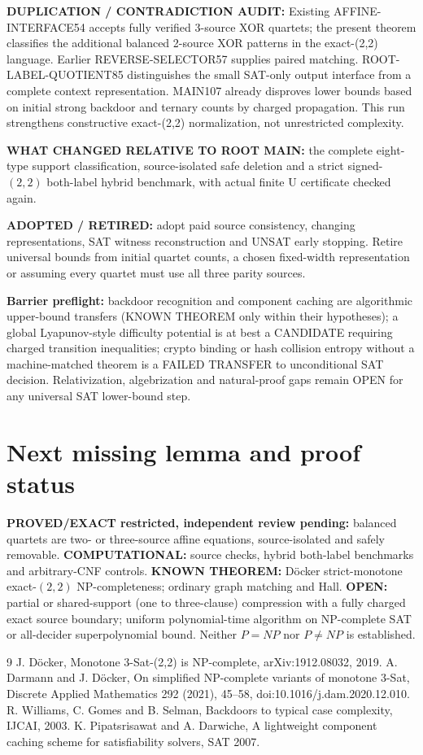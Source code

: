 \documentclass[11pt]{article}
\begin{document}
\textbf{DUPLICATION / CONTRADICTION AUDIT:} Existing AFFINE-INTERFACE54 accepts fully verified 3-source XOR quartets; the present theorem classifies the additional balanced 2-source XOR patterns in the exact-(2,2) language. Earlier REVERSE-SELECTOR57 supplies paired matching. ROOT-LABEL-QUOTIENT85 distinguishes the small SAT-only output interface from a complete context representation. MAIN107 already disproves lower bounds based on initial strong backdoor and ternary counts by charged propagation. This run strengthens constructive exact-(2,2) normalization, not unrestricted complexity.

\textbf{WHAT CHANGED RELATIVE TO ROOT MAIN:} the complete eight-type support classification, source-isolated safe deletion and a strict signed-$(2,2)$ both-label hybrid benchmark, with actual finite U certificate checked again.

\textbf{ADOPTED / RETIRED:} adopt paid source consistency, changing representations, SAT witness reconstruction and UNSAT early stopping. Retire universal bounds from initial quartet counts, a chosen fixed-width representation or assuming every quartet must use all three parity sources.

\textbf{Barrier preflight:} backdoor recognition and component caching are algorithmic upper-bound transfers (KNOWN THEOREM only within their hypotheses); a global Lyapunov-style difficulty potential is at best a CANDIDATE requiring charged transition inequalities; crypto binding or hash collision entropy without a machine-matched theorem is a FAILED TRANSFER to unconditional SAT decision. Relativization, algebrization and natural-proof gaps remain OPEN for any universal SAT lower-bound step.

\section{Next missing lemma and proof status}
\textbf{PROVED/EXACT restricted, independent review pending:} balanced quartets are two- or three-source affine equations, source-isolated and safely removable. \textbf{COMPUTATIONAL:} source checks, hybrid both-label benchmarks and arbitrary-CNF controls. \textbf{KNOWN THEOREM:} D\"ocker strict-monotone exact-$(2,2)$ NP-completeness; ordinary graph matching and Hall. \textbf{OPEN:} partial or shared-support (one to three-clause) compression with a fully charged exact source boundary; uniform polynomial-time algorithm on NP-complete SAT or all-decider superpolynomial bound. Neither $P=NP$ nor $P\ne NP$ is established.

\begin{thebibliography}{9}
 J. D\"ocker, Monotone 3-Sat-(2,2) is NP-complete, arXiv:1912.08032, 2019.
 A. Darmann and J. D\"ocker, On simplified NP-complete variants of monotone 3-Sat, Discrete Applied Mathematics 292 (2021), 45--58, doi:10.1016/j.dam.2020.12.010.
 R. Williams, C. Gomes and B. Selman, Backdoors to typical case complexity, IJCAI, 2003.
 K. Pipatsrisawat and A. Darwiche, A lightweight component caching scheme for satisfiability solvers, SAT 2007.
\end{thebibliography}
\end{document}
